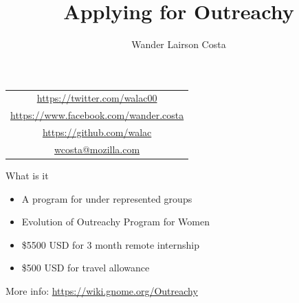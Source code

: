 \documentclass[pdf]{beamer}
\title[Outreachy]{Applying for Outreachy}
\author{{\Large Wander Lairson Costa}}
\institute{{\large Mozilla Corporation}}
\date{}
\begin{document}
\begin{frame}
  \titlepage
  \begin{center}
    \begin{tabular}{c}
      \url{https://twitter.com/walac00} \\
      \url{https://www.facebook.com/wander.costa} \\
      \url{https://github.com/walac} \\
      \href{mailto:wcosta@mozilla.com}{wcosta@mozilla.com}
    \end{tabular}
  \end{center}
\end{frame}

\begin{frame}{What is it}
  \begin{itemize}
    \item A program for under represented groups
    \item Evolution of Outreachy Program for Women
    \item \$5500 USD for 3 month remote internship
    \item \$500 USD for travel allowance
  \end{itemize}

  More info: \url{https://wiki.gnome.org/Outreachy}
\end{frame}
\end{document}
